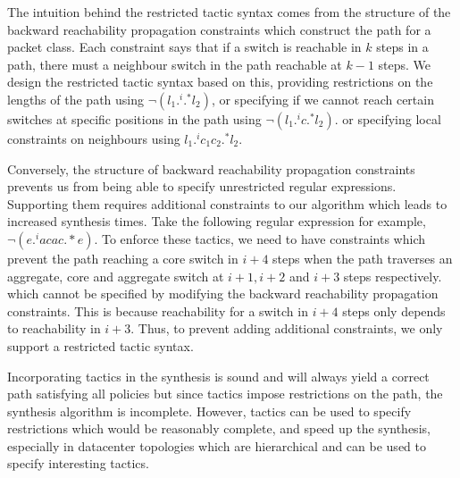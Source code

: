 The intuition behind the restricted tactic syntax comes from the structure of the backward reachability propagation 
constraints which construct the path for a packet class. Each constraint says that if a switch is reachable in $k$ steps in a path,
 there must a neighbour switch in the path reachable at $k-1$ steps. We design the restricted tactic syntax based
  on this, providing restrictions on the lengths of the path using $\neg (l_1 .^i .^* l_2)$, or specifying if we cannot 
  reach certain switches at specific positions in the path using  $\neg (l_1 .^i c .^* l_2)$. or specifying local 
  constraints on neighbours using $l_1  .^i c_1 c_2 .^* l_2$.  
  
  Conversely, the structure of backward reachability propagation constraints 
  prevents us from being able to specify unrestricted regular expressions. Supporting them
  requires additional constraints to our algorithm which leads to increased synthesis times. 
  Take the following regular expression for example, $\neg(e .^i a c a c .*e)$. To enforce
  these tactics, we need to have constraints which prevent the path reaching a core switch in $i+4$
  steps when the path traverses an aggregate, core and aggregate switch at $i+1, i+2$ and $i+3$ steps
  respectively. which cannot be specified by modifying the backward reachability propagation 
  constraints. This is because reachability for a switch in $i + 4$ steps only depends to reachability in $i+3$.
  Thus, to prevent adding additional constraints, we only support a restricted tactic syntax.   

Incorporating tactics in the synthesis is sound and will always yield a correct path satisfying all policies
 but since tactics impose restrictions on the path, the synthesis algorithm is incomplete. 
 However, tactics can be used to specify restrictions which would be reasonably complete, 
 and speed up the synthesis, especially in datacenter topologies which are hierarchical 
 and can be used to specify interesting tactics. 


